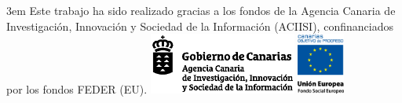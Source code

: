 \cleardoublepage
\thispagestyle{empty}
\null\vskip 6cm
\centering
\graphicspath{{./images/bmps/}{./images/vects/}}
\hfill\begin{minipage}[p]{0.85\textwidth}\parindent 3em
\centering
Este trabajo ha sido realizado gracias a los fondos de la Agencia Canaria de Investigación, Innovación y Sociedad de la Información (ACIISI), confinanciados por los fondos FEDER (EU).
\vskip 0.5cm
\includegraphics[height=2cm]{aciisi_negro}
\hskip 1cm
\includegraphics[height=2cm]{fondo_social_europeo_cop_ue}
\end{minipage}
